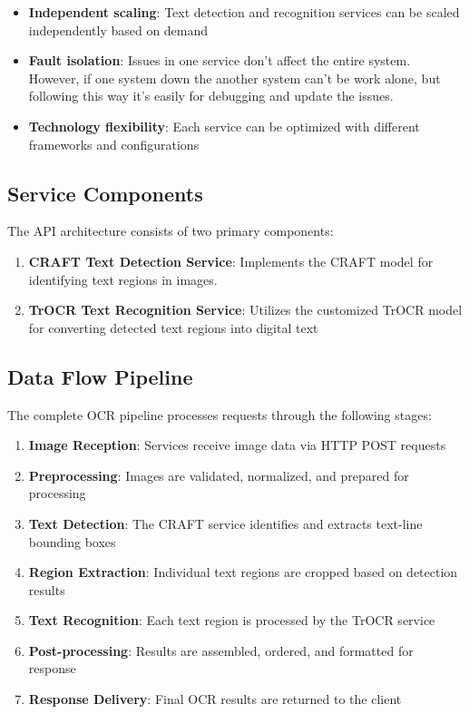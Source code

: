 {\begin{itemize}
\item \textbf{Independent scaling}: Text detection and recognition services can be scaled independently based on demand
\item \textbf{Fault isolation}: Issues in one service don't affect the entire system. However, if one system down the another system can't be work alone, but following this way it's easily for debugging and update the issues.
\item \textbf{Technology flexibility}: Each service can be optimized with different frameworks and configurations
\end{itemize}

\subsection{Service Components}
\label{subsec:service-components}

The API architecture consists of two primary components:

\begin{enumerate}
\item \textbf{CRAFT Text Detection Service}: Implements the CRAFT model for identifying text regions in images.
\item \textbf{TrOCR Text Recognition Service}: Utilizes the customized TrOCR model for converting detected text regions into digital text
\end{enumerate}

\subsection{Data Flow Pipeline}
\label{subsec:data-flow}

The complete OCR pipeline processes requests through the following stages:

\begin{enumerate}
\item \textbf{Image Reception}: Services receive image data via HTTP POST requests
\item \textbf{Preprocessing}: Images are validated, normalized, and prepared for processing
\item \textbf{Text Detection}: The CRAFT service identifies and extracts text-line bounding boxes
\item \textbf{Region Extraction}: Individual text regions are cropped based on detection results
\item \textbf{Text Recognition}: Each text region is processed by the TrOCR service
\item \textbf{Post-processing}: Results are assembled, ordered, and formatted for response
\item \textbf{Response Delivery}: Final OCR results are returned to the client
\end{enumerate}

}
